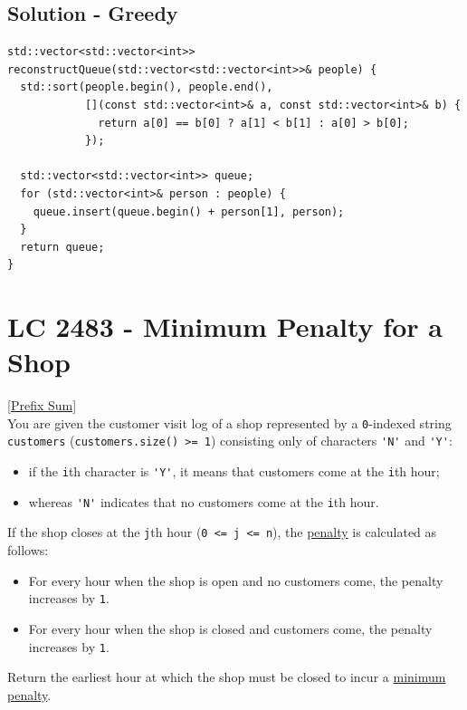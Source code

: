 \subsection*{Solution - Greedy}
\begin{lstlisting}
std::vector<std::vector<int>> reconstructQueue(std::vector<std::vector<int>>& people) {
  std::sort(people.begin(), people.end(),
            [](const std::vector<int>& a, const std::vector<int>& b) {
              return a[0] == b[0] ? a[1] < b[1] : a[0] > b[0];
            });

  std::vector<std::vector<int>> queue;
  for (std::vector<int>& person : people) {
    queue.insert(queue.begin() + person[1], person);
  }
  return queue;
}
\end{lstlisting}

\section{LC 2483 - Minimum Penalty for a Shop}\label{lc2483}
\hyperref[sec:prefix_sum]{[Prefix Sum]}\\

You are given the customer visit log of a shop represented by a {\colorbox{CodeBackground}{\lstinline|0|}}-indexed string {\colorbox{CodeBackground}{\lstinline|customers|}} ({\colorbox{CodeBackground}{\lstinline|customers.size() >= 1|}}) consisting only of characters {\colorbox{CodeBackground}{\lstinline|'N'|}} and {\colorbox{CodeBackground}{\lstinline|'Y'|}}:
\begin{itemize}
\item if the {\colorbox{CodeBackground}{\lstinline|i|}}th character is {\colorbox{CodeBackground}{\lstinline|'Y'|}}, it means that customers come at the {\colorbox{CodeBackground}{\lstinline|i|}}th hour;
\item whereas {\colorbox{CodeBackground}{\lstinline|'N'|}} indicates that no customers come at the {\colorbox{CodeBackground}{\lstinline|i|}}th hour.
\end{itemize}
If the shop closes at the {\colorbox{CodeBackground}{\lstinline|j|}}th hour ({\colorbox{CodeBackground}{\lstinline|0 <= j <= n|}}), the \ul{penalty} is calculated as follows:
\begin{itemize}
\item For every hour when the shop is open and no customers come, the penalty increases by {\colorbox{CodeBackground}{\lstinline|1|}}.
\item For every hour when the shop is closed and customers come, the penalty increases by {\colorbox{CodeBackground}{\lstinline|1|}}.
\end{itemize}
Return the earliest hour at which the shop must be closed to incur a \ul{minimum penalty}.\\

